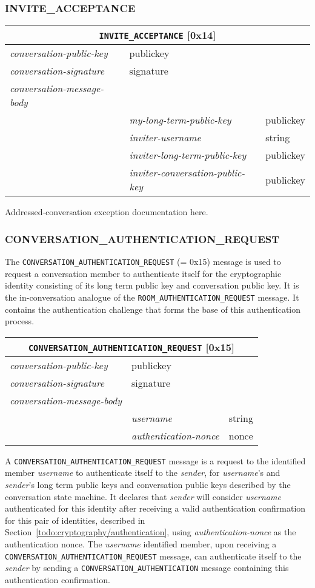 \documentclass{article}
\def\message#1{\texttt{#1}}
\def\field#1{\textit{#1}}
\newenvironment{conversationmessage}[2]{
\newcommand{\messagefield}[2]{
& \field{##1} & \textsf{##2} \\
\hline
}
\begin{tabular}{|l|l|l|}
\hline
\multicolumn{3}{|c|}{\message{#1} [#2]} \\
\hline
\hline
\field{conversation-public-key} & \multicolumn{2}{l|}{\textsf{publickey}} \\
\hline
\field{conversation-signature} & \multicolumn{2}{l|}{\textsf{signature}} \\
\hline
\field{conversation-message-body} & \multicolumn{2}{l|}{} \\
\hline
}{
\end{tabular}
}
\begin{document}
\subsubsection{INVITE\_ACCEPTANCE}
\label{sec:messages/invite-acceptance}

\begin{conversationmessage}{INVITE\_ACCEPTANCE}{0x14}
\messagefield{my-long-term-public-key}{publickey}
\messagefield{inviter-username}{string}
\messagefield{inviter-long-term-public-key}{publickey}
\messagefield{inviter-conversation-public-key}{publickey}
\end{conversationmessage}

Addressed-conversation exception documentation here.

\subsubsection{CONVERSATION\_AUTHENTICATION\_REQUEST}

The \message{CONVERSATION\_AUTHENTICATION\_REQUEST} (= 0x15) message is used to request a conversation member to authenticate itself for the cryptographic identity consisting of its long term public key and conversation public key.
It is the in-conversation analogue of the \message{ROOM\_AUTHENTICATION\_REQUEST} message.
It contains the authentication challenge that forms the base of this authentication process.

\begin{conversationmessage}{CONVERSATION\_AUTHENTICATION\_REQUEST}{0x15}
\messagefield{username}{string}
\messagefield{authentication-nonce}{nonce}
\end{conversationmessage}

A \message{CONVERSATION\_AUTHENTICATION\_REQUEST} message is a request to the identified member \field{username} to authenticate itself to the \field{sender}, for \field{username}'s and \field{sender}'s long term public keys and conversation public keys described by the conversation state machine.
It declares that \field{sender} will consider \field{username} authenticated for this identity after receiving a valid authentication confirmation for this pair of identities, described in Section~\ref{todo:cryptography/authentication}, using \field{authentication-nonce} as the authentication nonce.
The \field{username} identified member, upon receiving a \message{CONVERSATION\_AUTHENTICATION\_REQUEST} message, can authenticate itself to the \field{sender} by sending a \message{CONVERSATION\_AUTHENTICATION} message containing this authentication confirmation.
\end{document}
